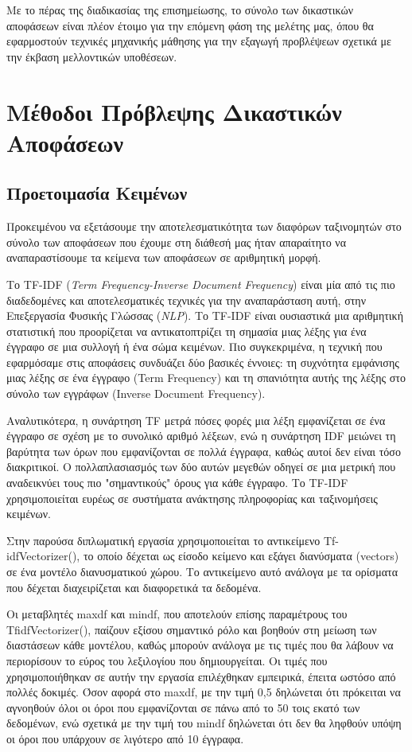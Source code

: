 \documentclass[diploma]{softlab-thesis}
\begin{document}
\begin{enumerate}
\begin{enumerate}
Με το πέρας της διαδικασίας της επισημείωσης, το σύνολο των δικαστικών αποφάσεων είναι πλέον έτοιμο για την επόμενη φάση της μελέτης μας, όπου θα εφαρμοστούν τεχνικές μηχανικής μάθησης για την εξαγωγή προβλέψεων σχετικά με την έκβαση μελλοντικών υποθέσεων.

 
\chapter{Μέθοδοι Πρόβλεψης Δικαστικών Αποφάσεων}


\section{Προετοιμασία Κειμένων}

Προκειμένου να εξετάσουμε την αποτελεσματικότητα των διαφόρων ταξινομητών στο σύνολο των αποφάσεων που έχουμε στη διάθεσή μας ήταν απαραίτητο να αναπαραστίσουμε τα κείμενα των αποφάσεων σε αριθμητική μορφή.

Το TF-IDF (\textit{Term Frequency-Inverse Document Frequency}) είναι μία από τις πιο διαδεδομένες και αποτελεσματικές τεχνικές για την αναπαράσταση αυτή, στην Επεξεργασία Φυσικής Γλώσσας (\textit{NLP}). Το TF-IDF είναι ουσιαστικά μια αριθμητική στατιστική που προορίζεται να αντικατοπτρίζει τη σημασία μιας λέξης για ένα έγγραφο σε μια συλλογή ή ένα σώμα κειμένων. Πιο συγκεκριμένα, η τεχνική που εφαρμόσαμε στις αποφάσεις συνδυάζει δύο βασικές έννοιες: τη συχνότητα εμφάνισης μιας λέξης σε ένα έγγραφο (Term Frequency) και τη σπανιότητα αυτής της λέξης στο σύνολο των εγγράφων (Inverse Document Frequency).

Αναλυτικότερα, η συνάρτηση TF μετρά πόσες φορές μια λέξη εμφανίζεται σε ένα έγγραφο σε σχέση με το συνολικό αριθμό λέξεων, ενώ η συνάρτηση IDF μειώνει τη βαρύτητα των όρων που εμφανίζονται σε πολλά έγγραφα, καθώς αυτοί δεν είναι τόσο διακριτικοί. Ο πολλαπλασιασμός των δύο αυτών μεγεθών οδηγεί σε μια μετρική που αναδεικνύει τους πιο "σημαντικούς" όρους για κάθε έγγραφο. Το TF-IDF χρησιμοποιείται ευρέως σε συστήματα ανάκτησης πληροφορίας και ταξινομήσεις κειμένων.

Στην παρούσα διπλωματική εργασία χρησιμοποιείται το αντικείμενο Tf-idfVectorizer(), το οποίο δέχεται ως είσοδο κείμενο και εξάγει διανύσματα (vectors) σε ένα μοντέλο διανυσματικού χώρου. Το αντικείμενο αυτό ανάλογα με τα ορίσματα που δέχεται διαχειρίζεται και διαφορετικά τα δεδομένα. 

Οι μεταβλητές maxdf και mindf, που αποτελούν επίσης παραμέτρους του TfidfVectorizer(), παίζουν εξίσου σημαντικό ρόλο και βοηθούν στη μείωση των διαστάσεων κάθε μοντέλου, καθώς μπορούν ανάλογα με τις τιμές που θα λάβουν να περιορίσουν το εύρος του λεξιλογίου που δημιουργείται. Οι τιμές που χρησιμοποιήθηκαν σε αυτήν την εργασία επιλέχθηκαν εμπειρικά, έπειτα ωστόσο από πολλές δοκιμές. Όσον αφορά στο maxdf, με την τιμή 0,5 δηλώνεται ότι πρόκειται να αγνοηθούν όλοι οι όροι που εμφανίζονται σε πάνω από το 50 τοις εκατό των δεδομένων, ενώ σχετικά με την τιμή του mindf δηλώνεται ότι δεν θα ληφθούν υπόψη οι όροι που υπάρχουν σε λιγότερο από 10 έγγραφα.


\end{enumerate}
\end{enumerate}
\end{document}
